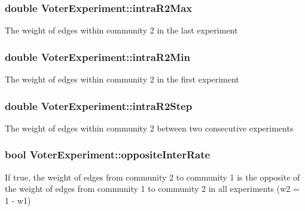 \subsubsection[{intra\+R2\+Max}]{\setlength{\rightskip}{0pt plus 5cm}double Voter\+Experiment\+::intra\+R2\+Max}\label{class_voter_experiment_a3ed3ee17da83a374fe1f35a995352ac7}
The weight of edges within community 2 in the last experiment \hypertarget{class_voter_experiment_a95db9758a55853d37f40ea5422477f28}{}
\subsubsection[{intra\+R2\+Min}]{\setlength{\rightskip}{0pt plus 5cm}double Voter\+Experiment\+::intra\+R2\+Min}\label{class_voter_experiment_a95db9758a55853d37f40ea5422477f28}
The weight of edges within community 2 in the first experiment \hypertarget{class_voter_experiment_a6239bcb8949bc8c5aab8d76c02e514af}{}
\subsubsection[{intra\+R2\+Step}]{\setlength{\rightskip}{0pt plus 5cm}double Voter\+Experiment\+::intra\+R2\+Step}\label{class_voter_experiment_a6239bcb8949bc8c5aab8d76c02e514af}
The weight of edges within community 2 between two consecutive experiments \hypertarget{class_voter_experiment_a6d5ba67afc5efb089c3aaf0da507f0e2}{}
\subsubsection[{opposite\+Inter\+Rate}]{\setlength{\rightskip}{0pt plus 5cm}bool Voter\+Experiment\+::opposite\+Inter\+Rate}\label{class_voter_experiment_a6d5ba67afc5efb089c3aaf0da507f0e2}
If true, the weight of edges from community 2 to community 1 is the opposite of the weight of edges from community 1 to community 2 in all experiments (w2 = 1 -\/ w1) \hypertarget{class_voter_experiment_a858051eb0f9c27891f50ddfb982b2534}{}
